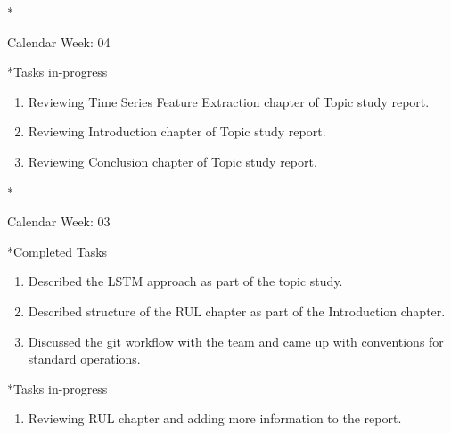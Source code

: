\documentclass[11pt,a4paper]{article}
\begin{document}
\newpage
\begin{section}*{Calendar Week: 04  \hfill \date{29 January, 2021}}
 \begin{refsection}
     \begin{subsection}*{Tasks in-progress}
         \begin{enumerate}
             \item
                   Reviewing Time Series Feature Extraction chapter of Topic study report.
             \item
                   Reviewing Introduction chapter of Topic study report.
             \item
                   Reviewing Conclusion chapter of Topic study report.
         \end{enumerate}
     \end{subsection}
 \end{refsection}
\end{section}
\newpage
\begin{section}*{Calendar Week: 03  \hfill \date{22 January, 2021}}
 \begin{refsection}
     \begin{subsection}*{Completed Tasks}
         \begin{enumerate}
             \item
                   Described the LSTM approach as part of the topic study.
             \item
                   Described structure of the RUL chapter as part of the Introduction chapter.
             \item
                   Discussed the git workflow with the team and came up with conventions for standard operations.
         \end{enumerate}
     \end{subsection}
     \begin{subsection}*{Tasks in-progress}
         \begin{enumerate}
             \item
                   Reviewing RUL chapter and adding more information to the report.
         \end{enumerate}
     \end{subsection}
 \end{refsection}
\end{section}
\end{document}
